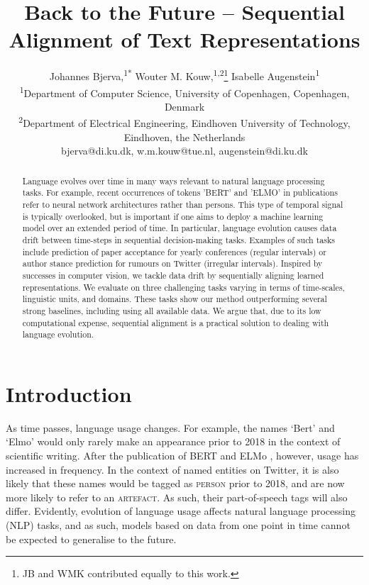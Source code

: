 \documentclass[letterpaper]{article} %
\title{Back to the Future -- Sequential Alignment of Text Representations}
\author{Johannes Bjerva,\textsuperscript{\rm 1*} Wouter M. Kouw,\textsuperscript{\rm 1,2}\thanks{JB and WMK contributed equally to this work.}
Isabelle Augenstein\textsuperscript{\rm 1}\\  %
\textsuperscript{\rm 1}Department of Computer Science, University of Copenhagen, Copenhagen, Denmark \\ 
\textsuperscript{\rm 2}Department of Electrical Engineering, Eindhoven University of Technology, Eindhoven, the Netherlands\\
bjerva@di.ku.dk, w.m.kouw@tue.nl, augenstein@di.ku.dk
}
\begin{document}
\maketitle

\begin{abstract}
  Language evolves over time in many ways relevant to natural language processing tasks. For example, recent occurrences of tokens 'BERT' and 'ELMO' in publications refer to neural network architectures rather than persons. This type of temporal signal is typically overlooked, but is important if one aims to deploy a machine learning model over an extended period of time. In particular, language evolution causes data drift between time-steps in sequential decision-making tasks. Examples of such tasks include prediction of paper acceptance for yearly conferences (regular intervals) or author stance prediction for rumours on Twitter (irregular intervals). Inspired by successes in computer vision, we tackle data drift by sequentially aligning learned representations. %
  We evaluate on three challenging tasks varying in terms of time-scales, linguistic units, and domains. These tasks show our method outperforming several strong baselines, including using all available data. We argue that, due to its low computational expense, sequential alignment is a practical solution to dealing with language evolution.
\end{abstract}


\section{Introduction}
\noindent As time passes, language usage changes.
For example, the names `Bert' and `Elmo' would only rarely make an appearance prior to 2018 in the context of scientific writing. After the publication of BERT \cite{bert} and ELMo \cite{elmo}, however, usage has increased in frequency. In the context of named entities on Twitter, it is also likely that these names would be tagged as \textsc{person} prior to 2018, and are now more likely to refer to an \textsc{artefact}. As such, their part-of-speech tags will also differ. Evidently, evolution of language usage affects natural language processing (NLP) tasks, and as such, models based on data from one point in time cannot be expected to generalise to the future.
\end{document}

